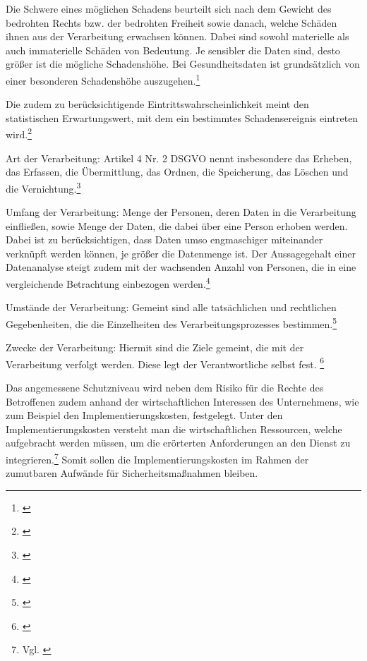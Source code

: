 \glqq Die Schwere eines möglichen Schadens beurteilt sich nach dem Gewicht des bedrohten Rechts bzw. der bedrohten Freiheit sowie danach, welche Schäden ihnen aus der Verarbeitung erwachsen können. Dabei sind sowohl materielle als auch immaterielle Schäden von Bedeutung. Je sensibler die Daten sind, desto größer ist die mögliche Schadenshöhe. Bei Gesundheitsdaten ist grundsätzlich von einer besonderen Schadenshöhe auszugehen.\grqq{}\footnote{\cite[S. 41]{Bundesaerztekammer2020}}

\glqq Die zudem zu berücksichtigende Eintrittswahrscheinlichkeit meint den statistischen Erwartungswert, mit dem ein bestimmtes Schadensereignis eintreten wird.\grqq{}\footnote{\cite[S. 41]{Bundesaerztekammer2020}}

\glqq Art der Verarbeitung: Artikel 4 Nr. 2 DSGVO nennt insbesondere das Erheben, das Erfassen, die Übermittlung, das Ordnen, die Speicherung, das Löschen und die Vernichtung.\grqq{}\footnote{\cite[S. 41]{Bundesaerztekammer2020}}

\glqq Umfang der Verarbeitung: Menge der Personen, deren Daten in die Verarbeitung einfließen, sowie Menge der Daten, die dabei über eine Person erhoben werden. Dabei ist zu berücksichtigen, dass Daten umso engmaschiger miteinander verknüpft werden können, je größer die Datenmenge ist. Der Aussagegehalt einer Datenanalyse steigt zudem mit der wachsenden Anzahl von Personen, die in eine vergleichende Betrachtung einbezogen werden.\grqq{}\footnote{\cite[S. 41]{Bundesaerztekammer2020}}

\glqq Umstände der Verarbeitung: Gemeint sind alle tatsächlichen und rechtlichen Gegebenheiten, die die Einzelheiten des Verarbeitungsprozesses bestimmen.\grqq{}\footnote{\cite[S. 42]{Bundesaerztekammer2020}}

\glqq Zwecke der Verarbeitung: Hiermit sind die Ziele gemeint, die mit der Verarbeitung verfolgt werden. Diese legt der Verantwortliche selbst fest.\grqq{}
\footnote{\cite[S. 42]{Bundesaerztekammer2020}}

Das angemessene Schutzniveau wird neben dem Risiko für die Rechte des Betroffenen zudem anhand der wirtschaftlichen Interessen des Unternehmens, wie zum Beispiel den Implementierungskosten, festgelegt. Unter den Implementierungskosten versteht man die wirtschaftlichen Ressourcen, welche aufgebracht werden müssen, um die erörterten Anforderungen an den Dienst zu integrieren.\footnote{Vgl. \cite[S. 42 f.]{Bundesaerztekammer2020}} Somit sollen die Implementierungskosten im Rahmen der zumutbaren Aufwände für Sicherheitsmaßnahmen bleiben. 

